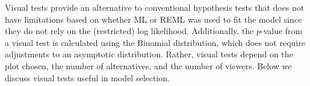 \documentclass{article} %
\begin{document}
%


Visual tests provide an alternative to conventional hypothesis tests that does not have limitations based on whether ML or REML was used to fit the model since they do not rely on the (restricted) log likelihood. Additionally, the $p$-value from a visual test is calculated using the Binomial distribution, which does not require adjustments to an asymptotic distribution. Rather, visual tests depend on the plot chosen, the number of alternatives, and the number of viewers. Below we discuss visual tests useful in model selection.
\end{document}
